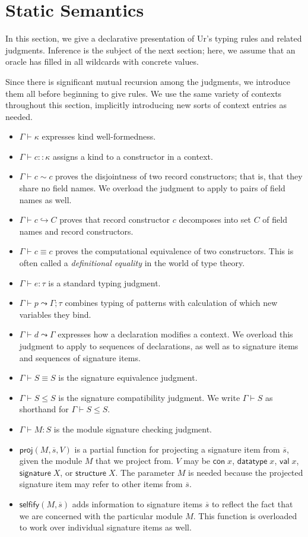 \documentclass{article}
\newcommand{\mt}[1]{\mathsf{#1}}
\begin{document}
\section{Static Semantics}

In this section, we give a declarative presentation of Ur's typing rules and related judgments.  Inference is the subject of the next section; here, we assume that an oracle has filled in all wildcards with concrete values.

Since there is significant mutual recursion among the judgments, we introduce them all before beginning to give rules.  We use the same variety of contexts throughout this section, implicitly introducing new sorts of context entries as needed.
\begin{itemize}
\item $\Gamma \vdash \kappa$ expresses kind well-formedness.
\item $\Gamma \vdash c :: \kappa$ assigns a kind to a constructor in a context.
\item $\Gamma \vdash c \sim c$ proves the disjointness of two record constructors; that is, that they share no field names.  We overload the judgment to apply to pairs of field names as well.
\item $\Gamma \vdash c \hookrightarrow C$ proves that record constructor $c$ decomposes into set $C$ of field names and record constructors.
\item $\Gamma \vdash c \equiv c$ proves the computational equivalence of two constructors.  This is often called a \emph{definitional equality} in the world of type theory.
\item $\Gamma \vdash e : \tau$ is a standard typing judgment.
\item $\Gamma \vdash p \leadsto \Gamma; \tau$ combines typing of patterns with calculation of which new variables they bind.
\item $\Gamma \vdash d \leadsto \Gamma$ expresses how a declaration modifies a context.  We overload this judgment to apply to sequences of declarations, as well as to signature items and sequences of signature items.
\item $\Gamma \vdash S \equiv S$ is the signature equivalence judgment.
\item $\Gamma \vdash S \leq S$ is the signature compatibility judgment.  We write $\Gamma \vdash S$ as shorthand for $\Gamma \vdash S \leq S$.
\item $\Gamma \vdash M : S$ is the module signature checking judgment.
\item $\mt{proj}(M, \overline{s}, V)$ is a partial function for projecting a signature item from $\overline{s}$, given the module $M$ that we project from.  $V$ may be $\mt{con} \; x$, $\mt{datatype} \; x$, $\mt{val} \; x$, $\mt{signature} \; X$, or $\mt{structure} \; X$.  The parameter $M$ is needed because the projected signature item may refer to other items from $\overline{s}$.
\item $\mt{selfify}(M, \overline{s})$ adds information to signature items $\overline{s}$ to reflect the fact that we are concerned with the particular module $M$.  This function is overloaded to work over individual signature items as well.
\end{itemize}
\end{document}
